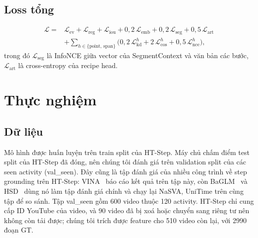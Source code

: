 \documentclass{IEEEtran}
\begin{document}
\subsection{Loss tổng}
\begin{equation}
\label{eq:total}
\begin{split}
\mathcal{L} = {} & \mathcal{L}_{\mathrm{ev}} + \mathcal{L}_{\mathrm{reg}} + \mathcal{L}_{\mathrm{iou}} + 0{,}2\,\mathcal{L}_{\mathrm{emb}} + 0{,}2\,\mathcal{L}_{\mathrm{seg}} + 0{,}5\,\mathcal{L}_{\mathrm{art}} \\
& + \sum_{h \in \{\mathrm{point},\,\mathrm{span}\}} \big(0{,}2\,\mathcal{L}^{h}_{\mathrm{kd}} + 2\,\mathcal{L}^{h}_{\mathrm{cos}} + 0{,}5\,\mathcal{L}^{h}_{\mathrm{nce}}\big),
\end{split}
\end{equation}
trong đó $\mathcal{L}_{\mathrm{seg}}$ là InfoNCE giữa vector của SegmentContext và văn bản các bước, $\mathcal{L}_{\mathrm{art}}$ là cross-entropy của recipe head.

\section{Thực nghiệm}

\subsection{Dữ liệu}
Mô hình được huấn luyện trên train split của HT-Step. Máy chủ chấm điểm test split của HT-Step đã đóng, nên chúng tôi đánh giá trên validation split của các seen activity (val\_seen). Đây cũng là tập đánh giá của nhiều công trình về step grounding trên HT-Step: VINA~\cite{vina} báo cáo kết quả trên tập này, còn BaGLM~\cite{baglm} và HSD~\cite{hsd} dùng nó làm tập đánh giá chính và chạy lại NaSVA, UniTime trên cùng tập để so sánh. Tập val\_seen gồm 600 video thuộc 120 activity. HT-Step chỉ cung cấp ID YouTube của video, và 90 video đã bị xoá hoặc chuyển sang riêng tư nên không còn tải được; chúng tôi trích được feature cho 510 video còn lại, với 2990 đoạn GT.
\end{document}
